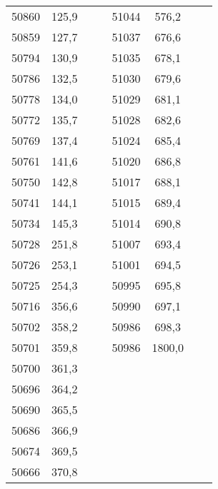 \documentclass[11pt]{article}
\begin{document}
{{\begin{tabular}{|c|c|cc|c|c|cc}
            50860 & 125,9 &  &  & 51044 & 576,2 &  & \tabularnewline
            \cline{1-2} \cline{5-6} 
            50859 & 127,7 &  &  & 51037 & 676,6 &  & \tabularnewline
            \cline{1-2} \cline{5-6} 
            50794 & 130,9 &  &  & 51035 & 678,1 &  & \tabularnewline
            \cline{1-2} \cline{5-6} 
            50786 & 132,5 &  &  & 51030 & 679,6 &  & \tabularnewline
            \cline{1-2} \cline{5-6} 
            50778 & 134,0 &  &  & 51029 & 681,1 &  & \tabularnewline
            \cline{1-2} \cline{5-6} 
            50772 & 135,7 &  &  & 51028 & 682,6 &  & \tabularnewline
            \cline{1-2} \cline{5-6} 
            50769 & 137,4 &  &  & 51024 & 685,4 &  & \tabularnewline
            \cline{1-2} \cline{5-6} 
            50761 & 141,6 &  &  & 51020 & 686,8 &  & \tabularnewline
            \cline{1-2} \cline{5-6} 
            50750 & 142,8 &  &  & 51017 & 688,1 &  & \tabularnewline
            \cline{1-2} \cline{5-6} 
            50741 & 144,1 &  &  & 51015 & 689,4 &  & \tabularnewline
            \cline{1-2} \cline{5-6} 
            50734 & 145,3 &  &  & 51014 & 690,8 &  & \tabularnewline
            \cline{1-2} \cline{5-6} 
            50728 & 251,8 &  &  & 51007 & 693,4 &  & \tabularnewline
            \cline{1-2} \cline{5-6} 
            50726 & 253,1 &  &  & 51001 & 694,5 &  & \tabularnewline
            \cline{1-2} \cline{5-6} 
            50725 & 254,3 &  &  & 50995 & 695,8 &  & \tabularnewline
            \cline{1-2} \cline{5-6} 
            50716 & 356,6 &  &  & 50990 & 697,1 &  & \tabularnewline
            \cline{1-2} \cline{5-6} 
            50702 & 358,2 &  &  & 50986 & 698,3 &  & \tabularnewline
            \cline{1-2} \cline{5-6} 
            50701 & 359,8 &  &  & 50986 & 1800,0 &  & \tabularnewline
            \cline{1-2} \cline{5-6} 
            50700 & 361,3 &  & \multicolumn{1}{c}{} & \multicolumn{1}{c}{} & \multicolumn{1}{c}{} &  & \tabularnewline
            \cline{1-2} 
            50696 & 364,2 &  & \multicolumn{1}{c}{} & \multicolumn{1}{c}{} & \multicolumn{1}{c}{} &  & \tabularnewline
            \cline{1-2} 
            50690 & 365,5 &  & \multicolumn{1}{c}{} & \multicolumn{1}{c}{} & \multicolumn{1}{c}{} &  & \tabularnewline
            \cline{1-2} 
            50686 & 366,9 &  & \multicolumn{1}{c}{} & \multicolumn{1}{c}{} & \multicolumn{1}{c}{} &  & \tabularnewline
            \cline{1-2} 
            50674 & 369,5 &  & \multicolumn{1}{c}{} & \multicolumn{1}{c}{} & \multicolumn{1}{c}{} &  & \tabularnewline
            \cline{1-2} 
            50666 & 370,8 &  & \multicolumn{1}{c}{} & \multicolumn{1}{c}{} & \multicolumn{1}{c}{} &  & \tabularnewline

\end{tabular}}}
\end{document}
